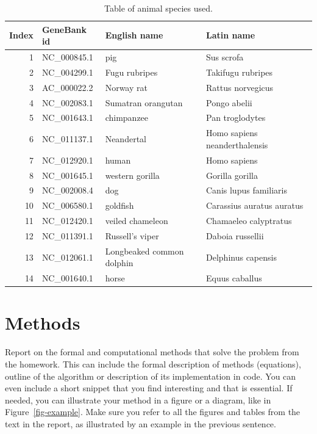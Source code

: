 \documentclass[a4paper,11pt]{article}
\begin{document}
\begin{table}[htbp]
\caption{Table of animal species used.}
\label{animalTable}
\begin{center}
\begin{tabular}{rllp{6cm}}
\hline
Index & GeneBank id & English name & Latin name\\
\hline
  1 &   NC\_000845.1 &                        pig &                     Sus scrofa \\
  2 &   NC\_004299.1 &              Fugu rubripes &              Takifugu rubripes \\ 
  3 &   AC\_000022.2 &                 Norway rat &              Rattus norvegicus \\
  4 &   NC\_002083.1 &         Sumatran orangutan &                   Pongo abelii \\
  5 &   NC\_001643.1 &                 chimpanzee &                Pan troglodytes \\
  6 &   NC\_011137.1 &                 Neandertal &  Homo sapiens neanderthalensis \\
  7 &   NC\_012920.1 &                      human &                   Homo sapiens \\
  8 &   NC\_001645.1 &            western gorilla &                Gorilla gorilla \\
  9 &   NC\_002008.4 &                        dog &         Canis lupus familiaris \\
 10 &   NC\_006580.1 &                   goldfish &      Carassius auratus auratus \\
 11 &   NC\_012420.1 &           veiled chameleon &          Chamaeleo calyptratus \\
 12 &   NC\_011391.1 &            Russell's viper &               Daboia russellii \\
 13 &   NC\_012061.1 &  Longbeaked common dolphin &             Delphinus capensis \\
 14 &   NC\_001640.1 &                      horse &                 Equus caballus 

\\
\hline
\end{tabular}
\end{center}
\end{table}


\section{Methods}

Report on the formal and computational methods that solve the problem from the homework. This can include the formal description of methods (equations),  outline of the algorithm or description of its  implementation in code. You can even include a short snippet that you find interesting and that is essential. If needed, you can illustrate your method in a figure or a diagram, like in Figure~\ref{fig-example}. Make sure you refer to all the figures and tables from the text in the report, as illustrated by an example in the previous sentence.
\end{document}
